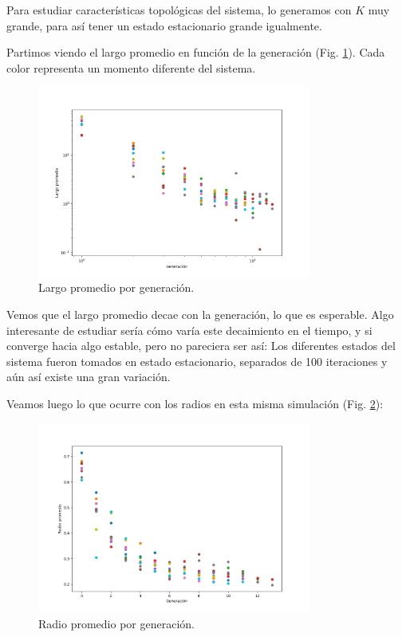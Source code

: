 \documentclass{article}
\begin{document}
Para estudiar características topológicas del sistema, lo generamos con $K$ muy grande, para así tener un estado estacionario grande igualmente.

Partimos viendo el largo promedio en función de la generación (Fig. \ref{fig:largo_vs_gen}). Cada color representa un momento diferente del sistema.

\begin{figure}[h!]
    \centering
    \includegraphics[width=0.8\textwidth]{graficos_inst/largo_vs_gen.png}
    \caption{Largo promedio por generación.}
    \label{fig:largo_vs_gen}
\end{figure}

Vemos que el largo promedio decae con la generación, lo que es esperable. Algo interesante de estudiar sería cómo varía este decaimiento en el tiempo, y si converge hacia algo estable, pero no pareciera ser así: Los diferentes estados del sistema fueron tomados en estado estacionario, separados de 100 iteraciones y aún así existe una gran variación.

Veamos luego lo que ocurre con los radios en esta misma simulación (Fig. \ref{fig:radio_vs_gen}):

\begin{figure}[h!]
    \centering
    \includegraphics[width=0.8\textwidth]{graficos_inst/radio_vs_gen.png}
    \caption{Radio promedio por generación.}
    \label{fig:radio_vs_gen}
\end{figure}
\end{document}
